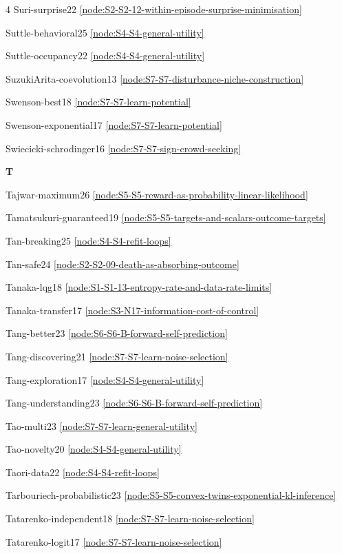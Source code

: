 \documentclass[10pt]{article}
\begin{document}
{\begin{multicols}{4}
Suri-surprise22 \hfill \ref{node:S2-S2-12-within-episode-surprise-minimisation}\par
Suttle-behavioral25 \hfill \ref{node:S4-S4-general-utility}\par
Suttle-occupancy22 \hfill \ref{node:S4-S4-general-utility}\par
SuzukiArita-coevolution13 \hfill \ref{node:S7-S7-disturbance-niche-construction}\par
Swenson-best18 \hfill \ref{node:S7-S7-learn-potential}\par
Swenson-exponential17 \hfill \ref{node:S7-S7-learn-potential}\par
Swiecicki-schrodinger16 \hfill \ref{node:S7-S7-sign-crowd-seeking}\par

\smallskip\textbf{T}\par
Tajwar-maximum26 \hfill \ref{node:S5-S5-reward-as-probability-linear-likelihood}\par
Tamatsukuri-guaranteed19 \hfill \ref{node:S5-S5-targets-and-scalars-outcome-targets}\par
Tan-breaking25 \hfill \ref{node:S4-S4-refit-loops}\par
Tan-safe24 \hfill \ref{node:S2-S2-09-death-as-absorbing-outcome}\par
Tanaka-lqg18 \hfill \ref{node:S1-S1-13-entropy-rate-and-data-rate-limits}\par
Tanaka-transfer17 \hfill \ref{node:S3-N17-information-cost-of-control}\par
Tang-better23 \hfill \ref{node:S6-S6-B-forward-self-prediction}\par
Tang-discovering21 \hfill \ref{node:S7-S7-learn-noise-selection}\par
Tang-exploration17 \hfill \ref{node:S4-S4-general-utility}\par
Tang-understanding23 \hfill \ref{node:S6-S6-B-forward-self-prediction}\par
Tao-multi23 \hfill \ref{node:S7-S7-learn-general-utility}\par
Tao-novelty20 \hfill \ref{node:S4-S4-general-utility}\par
Taori-data22 \hfill \ref{node:S4-S4-refit-loops}\par
Tarbouriech-probabilistic23 \hfill \ref{node:S5-S5-convex-twins-exponential-kl-inference}\par
Tatarenko-independent18 \hfill \ref{node:S7-S7-learn-noise-selection}\par
Tatarenko-logit17 \hfill \ref{node:S7-S7-learn-noise-selection}\par

\end{multicols}}
\end{document}
